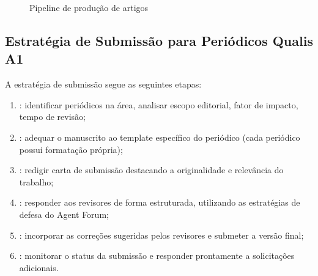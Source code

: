 \begin{figure}[htb]
\centering
{}
\caption{Pipeline de produção de artigos \qualisA{}}
\label{fig:pipeline-artigos}
\end{figure}

\subsection{Estratégia de Submissão para Periódicos Qualis A1}

A estratégia de submissão segue as seguintes etapas:

\begin{enumerate}
\item {}: identificar periódicos \qualisA{} na
      área, analisar escopo editorial, fator de impacto, tempo de revisão;
\item {}: adequar o manuscrito ao template específico do
      periódico (cada periódico possui formatação própria);
\item {}: redigir carta de submissão destacando a
      originalidade e relevância do trabalho;
\item {}: responder aos revisores de forma estruturada,
      utilizando as estratégias de defesa do Agent Forum;
\item {}: incorporar as correções sugeridas pelos
      revisores e submeter a versão final;
\item {}: monitorar o status da submissão e responder
      prontamente a solicitações adicionais.
\end{enumerate}

